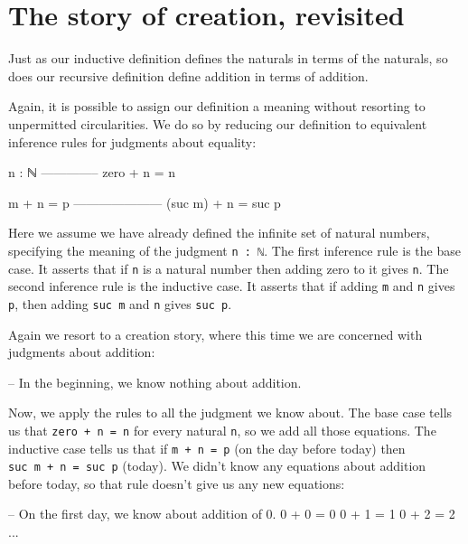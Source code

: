 \hypertarget{the-story-of-creation-revisited}{%
\section{The story of creation,
revisited}\label{the-story-of-creation-revisited}}

Just as our inductive definition defines the naturals in terms of the
naturals, so does our recursive definition define addition in terms of
addition.

Again, it is possible to assign our definition a meaning without
resorting to unpermitted circularities. We do so by reducing our
definition to equivalent inference rules for judgments about equality:

\begin{myDisplay}
n : ℕ
--------------
zero + n  =  n

m + n  =  p
---------------------
(suc m) + n  =  suc p
\end{myDisplay}

Here we assume we have already defined the infinite set of natural
numbers, specifying the meaning of the judgment \texttt{n\ :\ ℕ}. The
first inference rule is the base case. It asserts that if \texttt{n} is
a natural number then adding zero to it gives \texttt{n}. The second
inference rule is the inductive case. It asserts that if adding
\texttt{m} and \texttt{n} gives \texttt{p}, then adding \texttt{suc\ m}
and \texttt{n} gives \texttt{suc\ p}.

Again we resort to a creation story, where this time we are concerned
with judgments about addition:

\begin{myDisplay}
-- In the beginning, we know nothing about addition.
\end{myDisplay}

Now, we apply the rules to all the judgment we know about. The base case
tells us that \texttt{zero\ +\ n\ =\ n} for every natural \texttt{n}, so
we add all those equations. The inductive case tells us that if
\texttt{m\ +\ n\ =\ p} (on the day before today) then
\texttt{suc\ m\ +\ n\ =\ suc\ p} (today). We didn't know any equations
about addition before today, so that rule doesn't give us any new
equations:

\begin{myDisplay}
-- On the first day, we know about addition of 0.
0 + 0 = 0     0 + 1 = 1    0 + 2 = 2     ...
\end{myDisplay}

